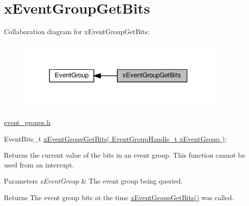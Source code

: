 \hypertarget{group__xEventGroupGetBits}{}\section{x\+Event\+Group\+Get\+Bits}
\label{group__xEventGroupGetBits}
Collaboration diagram for x\+Event\+Group\+Get\+Bits\+:\nopagebreak
\begin{figure}[H]
\begin{center}
\leavevmode
\includegraphics[width=291pt]{d8/dfc/group__xEventGroupGetBits}
\end{center}
\end{figure}
\hyperlink{event__groups_8h}{event\+\_\+groups.\+h} 
\begin{DoxyPre}
   EventBits\_t \hyperlink{event__groups_8h_a0ae86f092fb07ccb475ae938f9a12584}{xEventGroupGetBits( EventGroupHandle\_t xEventGroup )};
\end{DoxyPre}


Returns the current value of the bits in an event group. This function cannot be used from an interrupt.


\begin{DoxyParams}{Parameters}
{\em x\+Event\+Group} & The event group being queried.\\
\hline
\end{DoxyParams}
\begin{DoxyReturn}{Returns}
The event group bits at the time \hyperlink{event__groups_8h_a0ae86f092fb07ccb475ae938f9a12584}{x\+Event\+Group\+Get\+Bits()} was called. 
\end{DoxyReturn}
